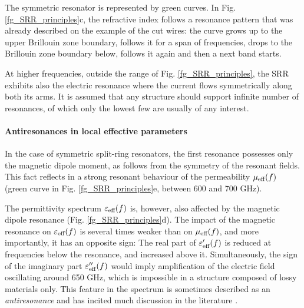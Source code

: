 The symmetric resonator is represented by green curves. In Fig. \ref{fg_SRR_principles}c, the refractive index follows a resonance pattern that was already described on the example of the cut wires: the curve grows up to the upper Brillouin zone boundary, follows it for a span of frequencies, drops to the Brillouin zone boundary below, follows it again and then a next band starts. 

At higher frequencies, outside the range of Fig. \ref{fg_SRR_principles}, the SRR exhibits also the electric resonance where the current flows symmetrically along both its arms. It is assumed that any structure should support infinite number of resonances, of which only the lowest few are usually of any interest.
\paragraph{Antiresonances in local effective parameters}%
In the case of symmetric split-ring resonators, the first resonance possesses only the magnetic dipole moment, as follows from the symmetry of the resonant fields. This fact reflects in a strong resonant behaviour of the permeability $\mu_{\text{eff} }(f)$ (green curve in Fig. \ref{fg_SRR_principles}e, between 600 and 700 GHz). 

The permittivity spectrum $\varepsilon_{\text{eff} }(f)$ is, however, also affected by the magnetic dipole resonance  (Fig. \ref{fg_SRR_principles}d). The impact of the magnetic resonance on $\varepsilon_{\text{eff} }(f)$ is several times weaker than on $\mu_{\text{eff} }(f)$, and more importantly, it has an opposite sign: The real part of $\varepsilon_{\text{eff} }'(f)$ is reduced at frequencies below the resonance, and increased above it. Simultaneously, the sign of the imaginary part $\varepsilon_{\text{eff} }''(f)$ would imply amplification of the electric field oscillating around 650 GHz, which is impossible in a structure composed of lossy materials only. This feature in the spectrum is sometimes described as an \textit{antiresonance} and has incited much discussion in the literature \cite{koschny2003resonant, wallen2011anti}. 
